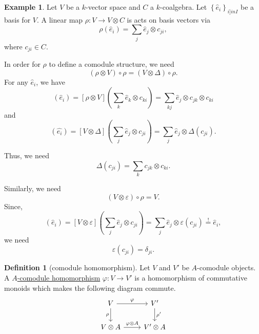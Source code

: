 \documentclass[a4paper,10pt]{scrreprt}
\newcommand{\defn}[1]{\ul{#1}}
\theoremstyle{definition}
\newtheorem{definition}{Definition}[section]
\newtheorem{example}{Example}[section]
\theoremstyle{plain}
\theoremstyle{remark}
\begin{document}
\begin{example}
  \label{eg:comoduleincoordinates}
  Let $V$ be a $k$-vector space and $C$ a $k$-coalgebra. Let $\left\{ \hat{e}_{i} \right\}_{i ]in I}$ be a basis for $V$. A linear map $\rho\colon V \to V\otimes C$ is acts on basis vectors via
  \begin{equation*}
    \rho(\hat{e}_{i}) = \sum_{j} \hat{e}_{j} \otimes c_{ji},
  \end{equation*}
  where $c_{ji} \in C$.

  In order for $\rho$ to define a comodule structure, we need 
  \begin{equation*}
    (\rho \otimes V) \circ \rho = (V \otimes \Delta) \circ \rho.
  \end{equation*}
  For any $\hat{e}_{i}$, we have 
  \begin{equation*}
    [(\rho \otimes V) \circ \rho] (\hat{e}_{i}) = [\rho \otimes V]\left( \sum_{k} \hat{e}_{k} \otimes c_{ki} \right) = \sum_{kj} \hat{e}_{j} \otimes c_{jk} \otimes c_{ki}
  \end{equation*}
  and
  \begin{equation*}
    [(V \otimes \Delta) \circ \rho](\hat{e_{i}}) = [V \otimes \Delta]\left( \sum_{j} \hat{e}_{j} \otimes c_{ji} \right) = \sum_{j} \hat{e}_{j} \otimes \Delta(c_{ji}).
  \end{equation*}

  Thus, we need 
  \begin{equation*}
    \Delta(c_{ji}) = \sum_{k} c_{jk} \otimes c_{ki}.
  \end{equation*}

  Similarly, we need 
  \begin{equation*}
    (V \otimes \varepsilon) \circ \rho = V.
  \end{equation*}
  Since,
  \begin{equation*}
    [(V \otimes \varepsilon) \circ \rho](\hat{e}_{i}) = [V \otimes \varepsilon] \left( \sum_{j} \hat{e}_{j} \otimes c_{ji} \right) = \sum_{j} \hat{e}_{j} \otimes \varepsilon(c_{ji}) \overset{!}{=} \hat{e}_{i},
  \end{equation*}
  we need
  \begin{equation*}
    \varepsilon(c_{ji}) = \delta_{ji}.
  \end{equation*}
\end{example}

\begin{definition}[comodule homomorphism]
  \label{def:comodulehomomorphism}
  Let $V$ and $V'$ be $A$-comodule objects. A \defn{$A$-comodule homomorphism} $\varphi\colon V \to V'$ is a homomorphism of commutative monoids which makes the following diagram commute.
  \begin{equation*}
    \begin{tikzcd}
      V 
      \arrow[r, "\varphi"]
      \arrow[d, swap, "\rho"]
      & V'
      \arrow[d, "\rho'"]
      \\
      V \otimes A
      \arrow[r, "\varphi \otimes A"]
      & V' \otimes A
    \end{tikzcd}
  \end{equation*}
\end{definition}
\end{document}
